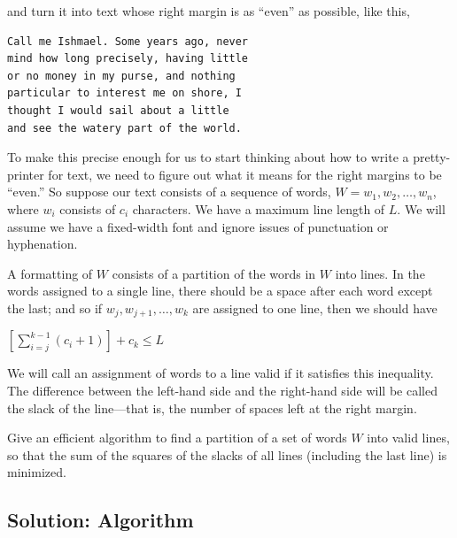 \documentclass[letter,11pt]{article}
\begin{document}
and turn it into text whose right margin is as ``even'' as possible, like this,


\begin{verbatim}
Call me Ishmael. Some years ago, never
mind how long precisely, having little
or no money in my purse, and nothing
particular to interest me on shore, I
thought I would sail about a little
and see the watery part of the world.
\end{verbatim}

To make this precise enough for us to start thinking about how to write a pretty-printer for text, we need to figure out what it means for the right margins to be ``even.'' So suppose our text consists of a sequence of words, $W={w_1,w_2,\dots,w_n}$, where $w_i$ consists of $c_i$ characters. We have a maximum line length of $L$. We will assume we have a fixed-width font and ignore issues of punctuation or hyphenation.

A formatting of $W$ consists of a partition of the words in $W$ into lines. In the words assigned to a single line, there should be a space after each word except the last; and so if $w_j,w_{j+1},\dots,w_k$ are assigned to one line, then we should have

\begin{center}
    $[\sum_{i=j}^{k-1} (c_i + 1)] + c_k \leq L$
\end{center}

We will call an assignment of words to a line valid if it satisfies this inequality. The difference between the left-hand side and the right-hand side will be called the slack of the line—that is, the number of spaces left at the right margin.

Give an efficient algorithm to find a partition of a set of words $W$ into valid lines, so that the sum of the squares of the slacks of all lines (including the last line) is minimized.

\subsection{Solution: Algorithm}
\end{document}
